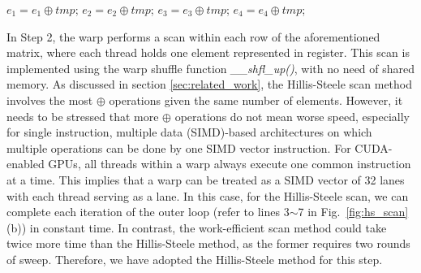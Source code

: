 \documentclass[article]{elsarticle}
\renewcommand{\hl}[1]{#1}
\begin{document}
{\begin{algorithm}[!h]
\begin{algorithmic}[1]
    
        	$e_1 = e_1 \oplus tmp$;
        \EndIf
    \EndFor
        	$e_2 = e_2 \oplus tmp$;
        \EndIf
    \EndFor
        	$e_3 = e_3 \oplus tmp$;
        \EndIf
    \EndFor
        	$e_4 = e_4 \oplus tmp$;
        \EndIf
    \EndFor
    
\EndProcedure
\end{algorithmic}
\end{algorithm}


\hl{In Step 2}, the warp performs a scan within each row of the aforementioned matrix, where each thread holds one element represented in register. This scan is implemented using the warp shuffle function \textit{\_\_shfl\_up()}, with no need of shared memory. As discussed in section \ref{sec:related_work}, the Hillis-Steele scan method involves the most $\oplus$ operations given the same number of elements. However, it needs to be stressed that more $\oplus$ operations do not mean worse speed, especially for single instruction, multiple data (SIMD)-based architectures on which multiple operations can be done by one SIMD vector instruction. For CUDA-enabled GPUs, all threads within a warp always execute one common instruction at a time. This implies that a warp can be treated as a SIMD vector of 32 lanes with each thread serving as a lane. In this case, for the Hillis-Steele scan, we can complete each iteration of the outer loop (refer to lines 3$\sim$7 in Fig.~\ref{fig:hs_scan}(b)) in constant time. In contrast, the work-efficient scan method could take twice more time than the Hillis-Steele method, as the former requires two rounds of sweep. Therefore, we have adopted the Hillis-Steele method for this step.

}
\end{document}
